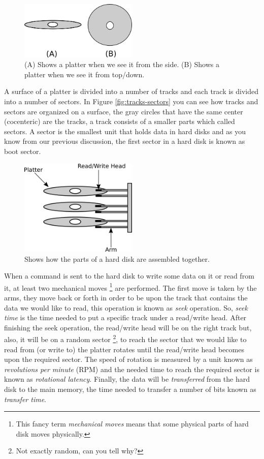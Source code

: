 \begin{figure}
\centering
\includegraphics[width=0.50000\textwidth]{Figures/bootloader-ch/a-platter.png}
\caption{(A) Shows a platter when we see it from the side. (B) Shows a
platter when we see it from top/down.}\label{fig:a-platter}
\end{figure}

A surface of a platter is divided into a number of tracks and each track
is divided into a number of sectors. In Figure \ref{fig:tracks-sectors}
you can see how tracks and sectors are organized on a surface, the gray
circles that have the same center (cocenteric) are the tracks, a track
consists of a smaller parts which called sectors. A sector is the
smallest unit that holds data in hard disks and as you know from our
previous discussion, the first sector in a hard disk is known as boot
sector.

\begin{figure}
\centering
\includegraphics[width=0.50000\textwidth]{Figures/bootloader-ch/platters-arms-heads.png}
\caption{Shows how the parts of a hard disk are assembled
together.}\label{fig:platters-arms-heads}
\end{figure}

When a command is sent to the hard disk to write some data on it or read
from it, at least two mechanical moves \footnote{This fancy term
  \emph{mechanical moves} means that some physical parts of hard disk
  moves physically.} are performed. The first move is taken by the arms,
they move back or forth in order to be upon the track that contains the
data we would like to read, this operation is known as \emph{seek}
operation. So, \emph{seek time} is the time needed to put a specific
track under a read/write head. After finishing the seek operation, the
read/write head will be on the right track but, also, it will be on a
random sector \footnote{Not exactly random, can you tell why?}, to reach
the sector that we would like to read from (or write to) the platter
rotates until the read/write head becomes upon the required sector. The
speed of rotation is measured by a unit known as \emph{revolutions per
minute} (RPM) and the needed time to reach the required sector is known
as \emph{rotational latency}. Finally, the data will be
\emph{transferred} from the hard disk to the main memory, the time
needed to transfer a number of bits known as \emph{transfer time}.


